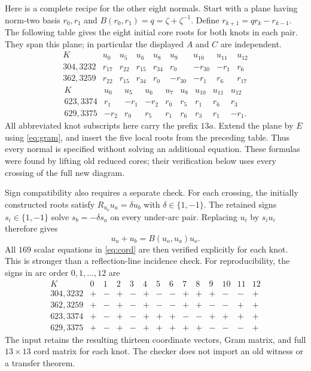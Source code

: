 \documentclass[11pt]{article}
\begin{document}
Here is a complete recipe for the other eight normals. Start with a
plane having norm-two basis $r_0,r_1$ and
$B(r_0,r_1)=q=\zeta+\zeta^{-1}$. Define
$r_{k+1}=qr_k-r_{k-1}$. The following table gives the eight initial
core roots for both knots in each pair. They span this plane; in
particular the displayed $A$ and $C$ are independent.
\[
\begin{array}{c|rrrrrrrr}
K&u_0&u_5&u_6&u_8&u_9&u_{10}&u_{11}&u_{12}\\\hline
304,3232&r_{17}&r_{22}&r_{15}&r_{34}&r_0&-r_{30}&-r_1&r_6\\
362,3259&r_{22}&r_{15}&r_{34}&r_0&-r_{30}&-r_1&r_6&r_{17}
\end{array}
\]
\[
\begin{array}{c|rrrrrrrr}
K&u_0&u_5&u_6&u_7&u_8&u_{10}&u_{11}&u_{12}\\\hline
623,3374&r_1&-r_1&-r_2&r_0&r_5&r_1&r_6&r_3\\
629,3375&-r_2&r_0&r_5&r_1&r_6&r_3&r_1&-r_1.
\end{array}
\]
All abbreviated knot subscripts here carry the prefix $13a$.
Extend the plane by $E$ using \eqref{eq:gram}, and insert the five
local roots from the preceding table. Thus every normal is specified
without solving an additional equation. These formulas were found
by lifting old reduced cores; their verification below uses every
crossing of the full new diagram.

Sign compatibility also requires a separate check. For each crossing,
the initially constructed roots satisfy $R_{u_o}u_a=\delta u_b$ with
$\delta\in\{1,-1\}$. The retained signs $s_i\in\{1,-1\}$ solve
$s_b=-\delta s_a$ on every under-arc pair. Replacing $u_i$ by
$s_iu_i$ therefore gives
\[
          u_a+u_b=B(u_o,u_a)u_o.
\]
All $169$ scalar equations in \eqref{eq:cord} are then verified
explicitly for each knot. This is stronger than a reflection-line
incidence check.
For reproducibility, the signs in arc order $0,1,\ldots,12$ are
\[
\begin{array}{c|rrrrrrrrrrrrr}
K&0&1&2&3&4&5&6&7&8&9&10&11&12\\\hline
304,3232&+&-&+&-&+&-&-&+&+&+&-&-&+\\
362,3259&+&-&+&-&+&-&-&+&+&-&-&+&+\\
623,3374&+&-&+&-&+&+&+&-&-&+&+&+&+\\
629,3375&+&-&+&-&+&+&+&+&+&-&-&-&+
\end{array}
\]
The input retains the resulting thirteen coordinate vectors, Gram
matrix, and full $13\times13$ cord matrix for each knot. The checker
does not import an old witness or a transfer theorem.
\end{document}
